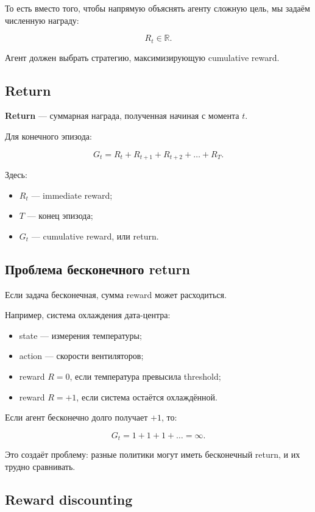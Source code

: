 \documentclass[a4paper,12pt]{article}
\begin{document}
То есть вместо того, чтобы напрямую объяснять агенту сложную цель, мы задаём численную награду:

\[
R_t \in \mathbb{R}.
\]

Агент должен выбрать стратегию, максимизирующую cumulative reward.

\subsection{Return}

\textbf{Return} --- суммарная награда, полученная начиная с момента \(t\).

Для конечного эпизода:

\[
G_t
=
R_t + R_{t+1} + R_{t+2} + \dots + R_T.
\]

Здесь:

\begin{itemize}
    \item \(R_t\) --- immediate reward;
    \item \(T\) --- конец эпизода;
    \item \(G_t\) --- cumulative reward, или return.
\end{itemize}

\subsection{Проблема бесконечного return}

Если задача бесконечная, сумма reward может расходиться.

Например, система охлаждения дата-центра:

\begin{itemize}
    \item state --- измерения температуры;
    \item action --- скорости вентиляторов;
    \item reward \(R=0\), если температура превысила threshold;
    \item reward \(R=+1\), если система остаётся охлаждённой.
\end{itemize}

Если агент бесконечно долго получает \(+1\), то:

\[
G_t = 1 + 1 + 1 + \dots = \infty.
\]

Это создаёт проблему: разные политики могут иметь бесконечный return, и их трудно сравнивать.

\subsection{Reward discounting}
\end{document}
